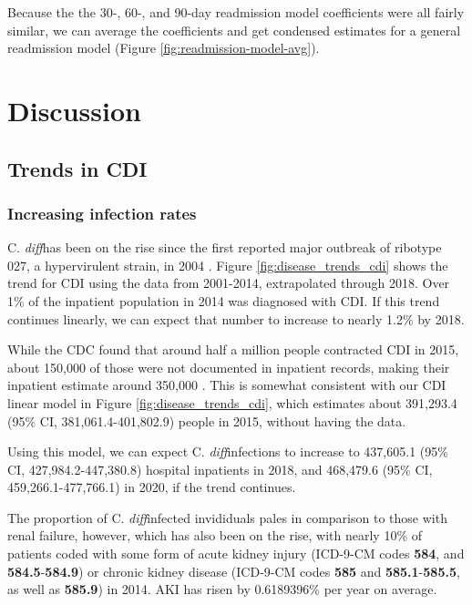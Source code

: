 \documentclass[12pt]{ociamthesis}\usepackage[]{graphicx}\usepackage[]{color}
\newcommand{\cdiff}{C. \textit{diff}}
\newcommand{\ci}[3]{#1 (95\% CI, #2-#3)}
\begin{document}
Because the the 30-, 60-, and 90-day readmission model coefficients were all fairly similar, 
we can average the coefficients and get condensed estimates for a general readmission model (Figure \ref{fig:readmission-model-avg}).




\chapter{Discussion}

\section{Trends in CDI}


\subsection{Increasing infection rates}

\cdiff has been on the rise since the first reported major outbreak of ribotype 027, a hypervirulent strain, in 2004 \cite{Pepin2004}. 
Figure \ref{fig:disease_trends_cdi} shows the trend for CDI using the data from 2001-2014, extrapolated through 2018. 
Over 1\% of the inpatient population in 2014 was diagnosed with CDI. If this trend continues linearly, we can expect that number
to increase to nearly 1.2\% by 2018. 

While the CDC found that around half a million people contracted CDI in 2015, about 150,000 of those were not documented in 
inpatient records, making their inpatient estimate around 350,000 \cite{CDC2018}. This is somewhat consistent with our CDI linear model in 
Figure \ref{fig:disease_trends_cdi}, which estimates about \ci{391,293.4}{381,061.4}{401,802.9} people in 2015,
without having the data.

Using this model, we can expect \cdiff infections to increase to \ci{437,605.1}{427,984.2}{447,380.8} hospital inpatients in 2018, and
\ci{468,479.6}{459,266.1}{477,766.1} in 2020, if the trend continues.




The proportion of \cdiff infected invididuals pales in comparison to those with renal failure, however, 
which has also been on the rise, with nearly 10\% of patients coded with
some form of acute kidney injury (ICD-9-CM codes \textbf{584}, and \textbf{584.5}-\textbf{584.9}) or chronic kidney disease 
(ICD-9-CM codes \textbf{585} and \textbf{585.1}-\textbf{585.5}, as well as \textbf{585.9}) in 2014. AKI has risen 
by 0.6189396\% per year on average.
\end{document}
